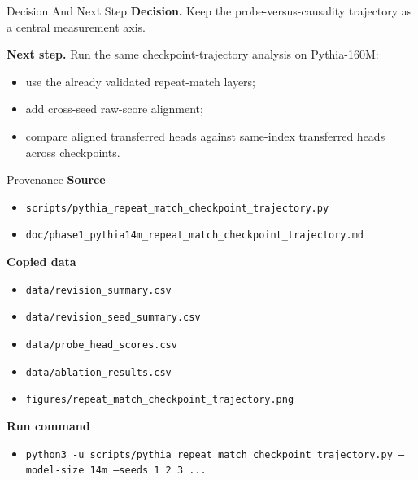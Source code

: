 \documentclass[aspectratio=169]{beamer}
\begin{document}
\begin{frame}{Decision And Next Step}
  \textbf{Decision.} Keep the probe-versus-causality trajectory as a central
  measurement axis.

  \vspace{0.8em}
  \textbf{Next step.}
  Run the same checkpoint-trajectory analysis on Pythia-160M:
  \begin{itemize}
    \item use the already validated repeat-match layers;
    \item add cross-seed raw-score alignment;
    \item compare aligned transferred heads against same-index transferred heads
    across checkpoints.
  \end{itemize}
\end{frame}

\begin{frame}{Provenance}
  \small
  \textbf{Source}
  \begin{itemize}
    \item \texttt{scripts/pythia\_repeat\_match\_checkpoint\_trajectory.py}
    \item \texttt{doc/phase1\_pythia14m\_repeat\_match\_checkpoint\_trajectory.md}
  \end{itemize}

  \vspace{0.4em}
  \textbf{Copied data}
  \begin{itemize}
    \item \texttt{data/revision\_summary.csv}
    \item \texttt{data/revision\_seed\_summary.csv}
    \item \texttt{data/probe\_head\_scores.csv}
    \item \texttt{data/ablation\_results.csv}
    \item \texttt{figures/repeat\_match\_checkpoint\_trajectory.png}
  \end{itemize}

  \vspace{0.4em}
  \textbf{Run command}
  \begin{itemize}
    \item \texttt{python3 -u scripts/pythia\_repeat\_match\_checkpoint\_trajectory.py --model-size 14m --seeds 1 2 3 ...}
  \end{itemize}
\end{frame}
\end{document}
